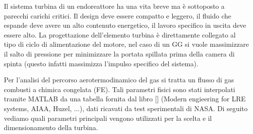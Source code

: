 Il sistema turbina di un endoreattore ha una vita breve ma è sottoposto a parecchi carichi critici. Il design deve essere compatto e leggero, il fluido che espande deve avere un alto contenuto energetico, il lavoro specifico in uscita deve essere alto. La progettazione dell'elemento turbina è direttamente collegato al tipo di ciclo di alimentazione del motore, nel caso di un GG si vuole massimizzare il salto di pressione per minimizzare la portata spillata prima della camera di spinta (questo infatti massimizza l'impulso specifico del sistema). 

Per l'analisi del percorso aerotermodinamico del gas si tratta un flusso di gas combusti a chimica congelata (FE). Tali parametri fisici sono stati interpolati tramite MATLAB da una tabella fornita dal libro [] (Modern engieering for LRE systems, AIAA, Huzel, ...), dati ricavati da test sperimentali di NASA. Di seguito vediamo quali parametri principali vengono utilizzati per la scelta e il dimensionamento della turbina. 

